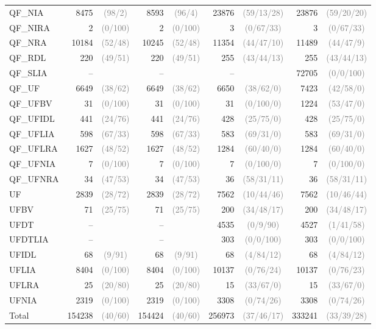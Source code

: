 \documentclass[dvipsnames,table,twoside,11pt]{article}
\newcommand{\gray}[1]{\textcolor{gray}{#1}}
\begin{document}
\begin{table}
{\begin{tabular}{lr@{\hskip3pt}cr@{\hskip3pt}cr@{\hskip3pt}cr@{\hskip3pt}c}
    QF\_NIA & 8475 & \gray{(98/2)} & 8593 & \gray{(96/4)} & 23876 & \gray{(59/13/28)} & 23876 & \gray{(59/20/20)}\\
    QF\_NIRA & 2 & \gray{(0/100)} & 2 & \gray{(0/100)} & 3 & \gray{(0/67/33)} & 3 & \gray{(0/67/33)}\\
    QF\_NRA & 10184 & \gray{(52/48)} & 10245 & \gray{(52/48)} & 11354 & \gray{(44/47/10)} & 11489 & \gray{(44/47/9)}\\
    QF\_RDL & 220 & \gray{(49/51)} & 220 & \gray{(49/51)} & 255 & \gray{(43/44/13)} & 255 & \gray{(43/44/13)}\\
    QF\_SLIA & -- & & -- & & -- & & 72705 & \gray{(0/0/100)}\\
    QF\_UF & 6649 & \gray{(38/62)} & 6649 & \gray{(38/62)} & 6650 & \gray{(38/62/0)} & 7423 & \gray{(42/58/0)}\\
    QF\_UFBV & 31 & \gray{(0/100)} & 31 & \gray{(0/100)} & 31 & \gray{(0/100/0)} & 1224 & \gray{(53/47/0)}\\
    QF\_UFIDL & 441 & \gray{(24/76)} & 441 & \gray{(24/76)} & 428 & \gray{(25/75/0)} & 428 & \gray{(25/75/0)}\\
    QF\_UFLIA & 598 & \gray{(67/33)} & 598 & \gray{(67/33)} & 583 & \gray{(69/31/0)} & 583 & \gray{(69/31/0)}\\
    QF\_UFLRA & 1627 & \gray{(48/52)} & 1627 & \gray{(48/52)} & 1284 & \gray{(60/40/0)} & 1284 & \gray{(60/40/0)}\\
    QF\_UFNIA & 7 & \gray{(0/100)} & 7 & \gray{(0/100)} & 7 & \gray{(0/100/0)} & 7 & \gray{(0/100/0)}\\
    QF\_UFNRA & 34 & \gray{(47/53)} & 34 & \gray{(47/53)} & 36 & \gray{(58/31/11)} & 36 & \gray{(58/31/11)}\\
    UF & 2839 & \gray{(28/72)} & 2839 & \gray{(28/72)} & 7562 & \gray{(10/44/46)} & 7562 & \gray{(10/46/44)}\\
    UFBV & 71 & \gray{(25/75)} & 71 & \gray{(25/75)} & 200 & \gray{(34/48/17)} & 200 & \gray{(34/48/17)}\\
    UFDT & -- & & -- & & 4535 & \gray{(0/9/90)} & 4527 & \gray{(1/41/58)}\\
    UFDTLIA & -- & & -- & & 303 & \gray{(0/0/100)} & 303 & \gray{(0/0/100)}\\
    UFIDL & 68 & \gray{(9/91)} & 68 & \gray{(9/91)} & 68 & \gray{(4/84/12)} & 68 & \gray{(4/84/12)}\\
    UFLIA & 8404 & \gray{(0/100)} & 8404 & \gray{(0/100)} & 10137 & \gray{(0/76/24)} & 10137 & \gray{(0/76/23)}\\
    UFLRA & 25 & \gray{(20/80)} & 25 & \gray{(20/80)} & 15 & \gray{(33/67/0)} & 15 & \gray{(33/67/0)}\\
    UFNIA & 2319 & \gray{(0/100)} & 2319 & \gray{(0/100)} & 3308 & \gray{(0/74/26)} & 3308 & \gray{(0/74/26)}\\
    \midrule
    Total      & 154238 & \gray{(40/60)} & 154424 & \gray{(40/60)} & 256973 & \gray{(37/46/17)} & 333241 & \gray{(33/39/28)}\\
    \bottomrule
  \end{tabular}}
\end{table}
\end{document}
